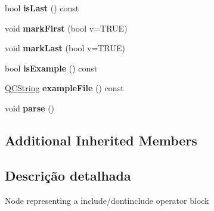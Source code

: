 \begin{DoxyCompactItemize}
\item 
\hypertarget{class_doc_inc_operator_a8dad52a23ff99a58cb64461598a11d5c}{bool {\bfseries is\-Last} () const }\label{class_doc_inc_operator_a8dad52a23ff99a58cb64461598a11d5c}

\item 
\hypertarget{class_doc_inc_operator_a7d3af17d92bf948006d448691283290c}{void {\bfseries mark\-First} (bool v=T\-R\-U\-E)}\label{class_doc_inc_operator_a7d3af17d92bf948006d448691283290c}

\item 
\hypertarget{class_doc_inc_operator_a9d9fd09f1f4baa960c94af1d41c60f95}{void {\bfseries mark\-Last} (bool v=T\-R\-U\-E)}\label{class_doc_inc_operator_a9d9fd09f1f4baa960c94af1d41c60f95}

\item 
\hypertarget{class_doc_inc_operator_ae2846c41642c97e04ab0f3e354c3edc0}{bool {\bfseries is\-Example} () const }\label{class_doc_inc_operator_ae2846c41642c97e04ab0f3e354c3edc0}

\item 
\hypertarget{class_doc_inc_operator_ab8e6a9216fc7af8e172e0b929f523cb2}{\hyperlink{class_q_c_string}{Q\-C\-String} {\bfseries example\-File} () const }\label{class_doc_inc_operator_ab8e6a9216fc7af8e172e0b929f523cb2}

\item 
\hypertarget{class_doc_inc_operator_ad7c704b34912678d95c13243cacf9d7f}{void {\bfseries parse} ()}\label{class_doc_inc_operator_ad7c704b34912678d95c13243cacf9d7f}

\end{DoxyCompactItemize}
\subsection*{Additional Inherited Members}


\subsection{Descrição detalhada}
Node representing a include/dontinclude operator block 

